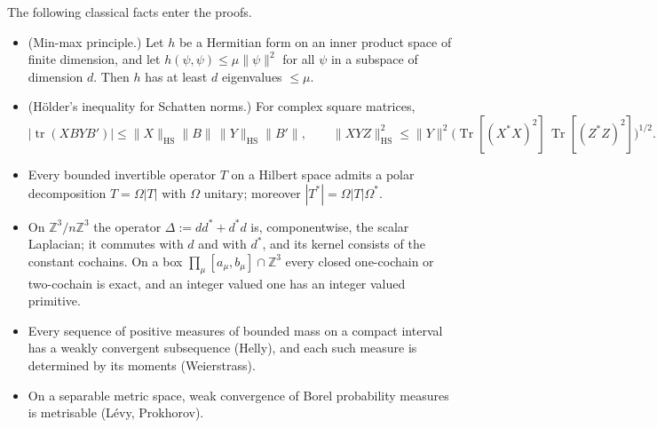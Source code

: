 \documentclass[11pt,letterpaper,reqno]{amsart}
\theoremstyle{definition}
\begin{document}
The following classical facts enter the proofs.
\begin{itemize}
\item[(K1)] (Min-max principle.) Let $h$ be a Hermitian form on an inner product space of finite dimension, and let $h(\psi,\psi)\le\mu\|\psi\|^2$ for all $\psi$ in a subspace of dimension $d$.
Then $h$ has at least $d$ eigenvalues $\le\mu$.
\item[(K2)] (H\"older's inequality for Schatten norms.) For complex square matrices,
\begin{equation*}
|\operatorname{tr}(XBYB')|\le\|X\|_{\mathrm{HS}}\|B\|\,\|Y\|_{\mathrm{HS}}\|B'\|,\qquad\|XYZ\|^2_{\mathrm{HS}}\le\|Y\|^2\bigl(\operatorname{Tr}[(X^*X)^2]\,\operatorname{Tr}[(Z^*Z)^2]\bigr)^{1/2}.
\end{equation*}
\item[(K3)] Every bounded invertible operator $T$ on a Hilbert space admits a polar decomposition $T=\Omega|T|$ with $\Omega$ unitary; moreover $|T^*|=\Omega|T|\Omega^*$.
\item[(K4)] On $\mathbb Z^3/n\mathbb Z^3$ the operator $\Delta:=dd^*+d^*d$ is, componentwise, the scalar Laplacian; it commutes with $d$ and with $d^*$, and its kernel consists of the constant cochains.
On a box $\prod_\mu[a_\mu,b_\mu]\cap\mathbb Z^3$ every closed one-cochain or two-cochain is exact, and an integer valued one has an integer valued primitive.
\item[(K5)] Every sequence of positive measures of bounded mass on a compact interval has a weakly convergent subsequence (Helly), and each such measure is determined by its moments (Weierstrass).
\item[(K6)] On a separable metric space, weak convergence of Borel probability measures is metrisable (L\'evy, Prokhorov).
\end{itemize}
\end{document}
